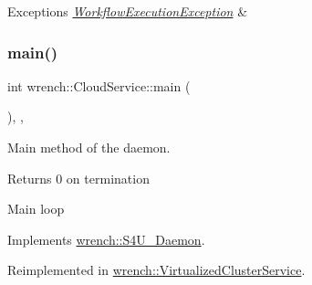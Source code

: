 \begin{DoxyExceptions}{Exceptions}
{\em \hyperlink{classwrench_1_1_workflow_execution_exception}{Workflow\+Execution\+Exception}} & \\
\hline
\end{DoxyExceptions}
\mbox{\label{classwrench_1_1_cloud_service_a95f0cc4adf4ad0d33cb757f24b78e9ff}} 
\subsubsection{\texorpdfstring{main()}{main()}}
{\footnotesize\ttfamily int wrench\+::\+Cloud\+Service\+::main (\begin{DoxyParamCaption}{ }\end{DoxyParamCaption})\hspace{0.3cm}{\ttfamily [override]}, {\ttfamily [protected]}, {\ttfamily [virtual]}}



Main method of the daemon. 

\begin{DoxyReturn}{Returns}
0 on termination 
\end{DoxyReturn}
Main loop 

Implements \hyperlink{classwrench_1_1_s4_u___daemon_a0073b1104849679756809330533400eb}{wrench\+::\+S4\+U\+\_\+\+Daemon}.



Reimplemented in \hyperlink{classwrench_1_1_virtualized_cluster_service_aa900061ac9077df089dfe760c921ec27}{wrench\+::\+Virtualized\+Cluster\+Service}.

\mbox{\label{classwrench_1_1_cloud_service_a6e0648b644dabaade3f3d746c27ea5bc}} 
